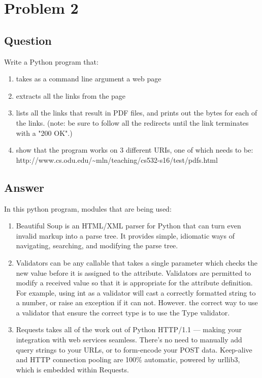 \section{Problem 2}
\label{problem2}
\subsection{Question}
\vspace*{10pt}
Write a Python program that:
\begin{enumerate}
\item takes as a command line argument a web page
\item extracts all the links from the page
\item lists all the links that result in PDF files, and prints out
      the bytes for each of the links.  (note: be sure to follow
      all the redirects until the link terminates with a "200 OK".)
\item show that the program works on 3 different URIs, one of which
needs to be:\\
http://www.cs.odu.edu/\~{}mln/teaching/cs532-s16/test/pdfs.html
\end{enumerate}
 
\subsection{Answer}
\vspace*{5mm}
In this python program, modules that are being used: 
\begin{enumerate}
\item Beautiful Soup is an HTML/XML parser for Python that can turn even invalid markup into a parse tree. It provides simple, idiomatic ways of navigating, searching, and modifying the parse tree. 
\\
\item Validators can be any callable that takes a single parameter which checks the new value before it is assigned to the attribute. Validators are permitted to modify a received value so that it is appropriate for the attribute definition. For example, using int as a validator will cast a correctly formatted string to a number, or raise an exception if it can not. However. the correct way to use a validator that ensure the correct type is to use the Type validator.
\\
\item Requests takes all of the work out of Python HTTP/1.1 — making your integration with web services seamless. There’s no need to manually add query strings to your URLs, or to form-encode your POST data. Keep-alive and HTTP connection pooling are 100\% automatic, powered by urllib3, which is embedded within Requests.
\end{enumerate}

